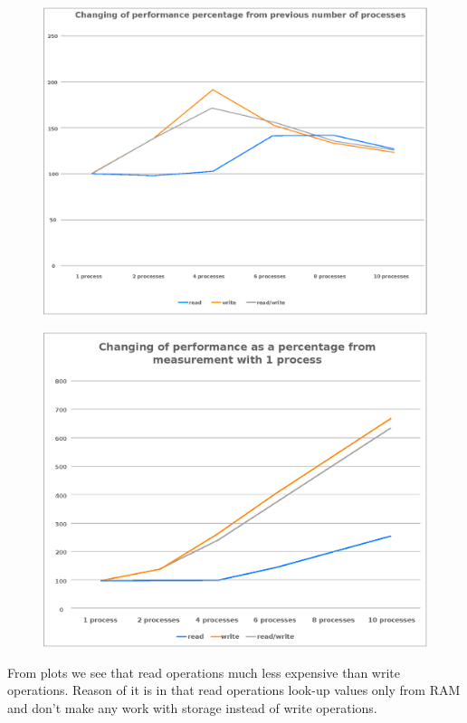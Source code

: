 \documentclass[final,a4paper]{article}
\begin{document}
\begin{figure}[H]
  \centering
  \includegraphics[scale=.7]{percentages.eps}
\end{figure}

\begin{figure}[H]
  \centering
  \includegraphics[scale=.6]{percentages1.eps}
\end{figure}

From plots we see that read operations much less expensive than write
operations. Reason of it is in that read operations look-up values only from RAM
and don’t make any work with storage instead of write operations.
\end{document}

